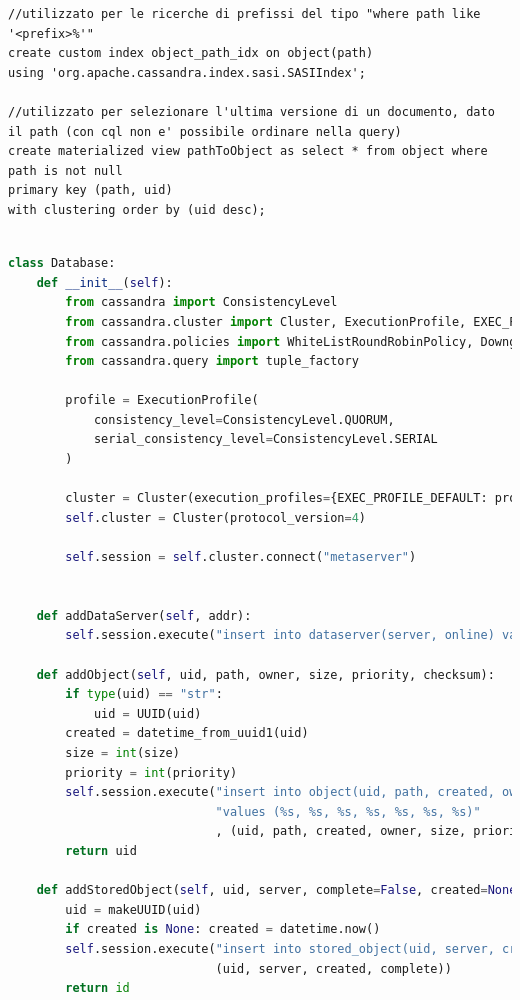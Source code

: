 \documentclass[11pt,a4paper,english]{article}
\begin{document}
\begin{lstlisting}[title=Struttura]
//utilizzato per le ricerche di prefissi del tipo "where path like '<prefix>%'"
create custom index object_path_idx on object(path)
using 'org.apache.cassandra.index.sasi.SASIIndex';

//utilizzato per selezionare l'ultima versione di un documento, dato il path (con cql non e' possibile ordinare nella query)
create materialized view pathToObject as select * from object where path is not null
primary key (path, uid)
with clustering order by (uid desc);


\end{lstlisting}


\begin{lstlisting}[language=Python, title=Codice]
class Database:
    def __init__(self):
        from cassandra import ConsistencyLevel
        from cassandra.cluster import Cluster, ExecutionProfile, EXEC_PROFILE_DEFAULT
        from cassandra.policies import WhiteListRoundRobinPolicy, DowngradingConsistencyRetryPolicy
        from cassandra.query import tuple_factory

        profile = ExecutionProfile(
            consistency_level=ConsistencyLevel.QUORUM,
            serial_consistency_level=ConsistencyLevel.SERIAL
        )

        cluster = Cluster(execution_profiles={EXEC_PROFILE_DEFAULT: profile})
        self.cluster = Cluster(protocol_version=4)

        self.session = self.cluster.connect("metaserver")


    def addDataServer(self, addr):
        self.session.execute("insert into dataserver(server, online) values (%s, false)", (addr, ))

    def addObject(self, uid, path, owner, size, priority, checksum):
        if type(uid) == "str":
            uid = UUID(uid)
        created = datetime_from_uuid1(uid)
        size = int(size)
        priority = int(priority)
        self.session.execute("insert into object(uid, path, created, owner, size, priority, checksum) "
                             "values (%s, %s, %s, %s, %s, %s, %s)"
                             , (uid, path, created, owner, size, priority, checksum))
        return uid

    def addStoredObject(self, uid, server, complete=False, created=None):
        uid = makeUUID(uid)
        if created is None: created = datetime.now()
        self.session.execute("insert into stored_object(uid, server, created, complete) values (%s, %s, %s, %s)",
                             (uid, server, created, complete))
        return id


\end{lstlisting}
\end{document}
